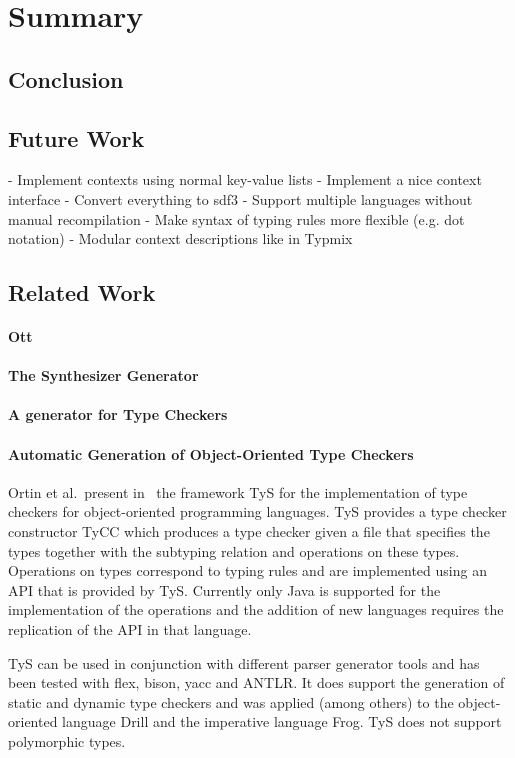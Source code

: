 \chapter{Summary}
\section{Conclusion}
\section{Future Work}
- Implement contexts using normal key-value lists
- Implement a nice context interface
- Convert everything to sdf3
- Support multiple languages without manual recompilation
- Make syntax of typing rules more flexible (e.g. dot notation)
- Modular context descriptions like in Typmix
\section{Related Work}
\subsubsection{Ott}
\subsubsection{The Synthesizer Generator}
\subsubsection{A generator for Type Checkers}
\subsubsection{Automatic Generation of Object-Oriented Type Checkers}
Ortin et al.\ present in~\cite{ortin2014automatic} the framework TyS
for the implementation of type checkers for object-oriented
programming languages. TyS provides a type checker constructor TyCC
which produces a type checker given a file that specifies the types
together with the subtyping relation and operations on these
types. Operations on types correspond to typing rules and are
implemented using an API that is provided by TyS. Currently only Java
is supported for the implementation of the operations and the addition
of new languages requires the replication of the API in that
language.

TyS can be used in conjunction with different parser generator tools
and has been tested with flex, bison, yacc and ANTLR. It does support
the generation of static and dynamic type checkers and was applied
(among others) to the object-oriented language Drill and the
imperative language Frog. TyS does not support polymorphic types.

